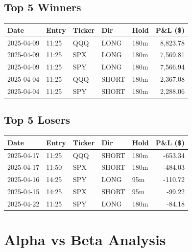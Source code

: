 \documentclass[11pt,a4paper,twoside]{article}
\begin{document}
\subsection{Top 5 Winners}
\noindent\begin{center}
\begin{tabular}{>{\color{txtmain}}l llll r}
\toprule
\rowcolor{cardbg}
\textbf{Date} & \textbf{Entry} & \textbf{Ticker} & \textbf{Dir} & \textbf{Hold} & \textbf{P\&L (\$)} \\
\midrule
2025-04-09 & 11:25 & QQQ & LONG & 180m & \textcolor{wingreen}{8,823.78} \\
2025-04-09 & 11:25 & SPX & LONG & 180m & \textcolor{wingreen}{7,569.81} \\
2025-04-09 & 11:25 & SPY & LONG & 180m & \textcolor{wingreen}{7,566.94} \\
2025-04-04 & 11:25 & QQQ & SHORT & 180m & \textcolor{wingreen}{2,367.08} \\
2025-04-04 & 11:25 & SPY & SHORT & 180m & \textcolor{wingreen}{2,288.06} \\
\bottomrule
\end{tabular}
\end{center}
\subsection{Top 5 Losers}
\noindent\begin{center}
\begin{tabular}{>{\color{txtmain}}l llll r}
\toprule
\rowcolor{cardbg}
\textbf{Date} & \textbf{Entry} & \textbf{Ticker} & \textbf{Dir} & \textbf{Hold} & \textbf{P\&L (\$)} \\
\midrule
2025-04-17 & 11:25 & QQQ & SHORT & 180m & \textcolor{lossred}{-653.34} \\
2025-04-17 & 11:50 & SPX & SHORT & 180m & \textcolor{lossred}{-484.03} \\
2025-04-16 & 14:25 & SPY & LONG & 95m & \textcolor{lossred}{-110.72} \\
2025-04-15 & 14:25 & SPX & SHORT & 95m & \textcolor{lossred}{-99.22} \\
2025-04-22 & 11:25 & SPY & LONG & 180m & \textcolor{lossred}{-84.18} \\
\bottomrule
\end{tabular}
\end{center}
\clearpage
\clearpage
\section{Alpha vs Beta Analysis}
\end{document}
